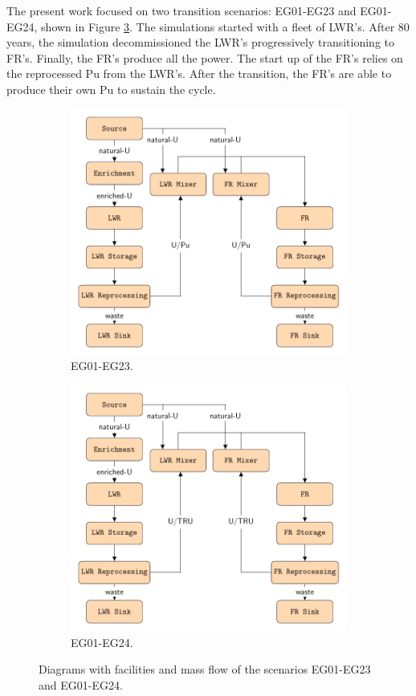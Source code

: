 \documentclass[11pt,letterpaper]{article}
\begin{document}
The present work focused on two transition scenarios: EG01-EG23 and EG01-EG24, shown in Figure \ref{fig:flow}. The simulations started with a fleet of LWR's. After 80 years, the simulation decommissioned the LWR's progressively transitioning to FR's. Finally, the FR's produce all the power. The start up of the FR's relies on the reprocessed Pu from the LWR's. After the transition, the FR's are able to produce their own Pu to sustain the cycle.

\begin{figure}[]
	\centering
	\begin{subfigure}[t]{\textwidth}
		\centering
		\includegraphics[width=0.7\linewidth]{23flow.pdf} 
		\caption{EG01-EG23.}
		\label{fig:23flow}
	\end{subfigure}
	\vspace{1cm}
	\begin{subfigure}[t]{\textwidth}
		\centering
		\includegraphics[width=0.7\linewidth]{24flow.pdf} 
		\caption{EG01-EG24.}
		\label{fig:24flow}
	\end{subfigure}
	\hfill
	\caption{Diagrams with facilities and mass flow of the scenarios EG01-EG23 and EG01-EG24.}
	\label{fig:flow}
\end{figure}
\end{document}
